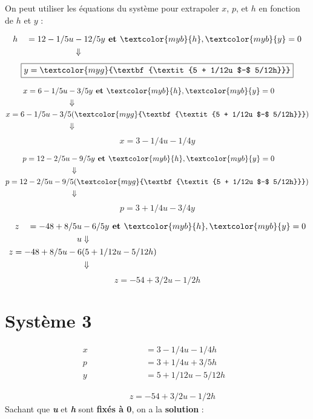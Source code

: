 \documentclass{report}
\newcommand{\Pointilles}[1]{%
  \par\nobreak
  \noindent\rule{0pt}{1.5\baselineskip}%
  \multido{}{#1}{\noindent\makebox[\linewidth]{\dotfill}\endgraf}%
  \bigskip%
}
\begin{document}
\begin{multicols*}{3}
On peut utiliser les équations du système pour extrapoler 
$x$, $p$, et $h$ en fonction de $h$ et $y$ :


\begin{align*}
    h \quad = 12 - 1/5u &-12/5y
    \textbf{ et } \textcolor{myb}{h}, \textcolor{myb}{y} = 0 
    \\
                 &\Downarrow
\end{align*}
      \[%
    \boxed{y = \textcolor{myg}{\textbf{\textit{5 + 1/12u $-$ 5/12h}}} }
      \]%


\begin{align*}
    x = 6 - 1/5u &-3/5y 
    \textbf{ et } \textcolor{myb}{h}, \textcolor{myb}{y} = 0 
    \\
      &\Downarrow
    \\ 
    x = 6 - 1/5u -3/&5(\textcolor{myg}{\textbf{\textit{5 + 1/12u $-$ 5/12h}}}) 
    \\
                    &\Downarrow
\end{align*}
      \[%
          \boxed{x = 3 -1/4u -1/4y}
      \]%

\begin{align*}
    p = 12 - 2/5u &-9/5y 
    \textbf{ et } \textcolor{myb}{h}, \textcolor{myb}{y} = 0 
    \\
      &\Downarrow
    \\ 
    p = 12 - 2/5u -9/&5(\textcolor{myg}{\textbf{\textit{5 + 1/12u $-$ 5/12h}}}) 
    \\
                    &\Downarrow
\end{align*}
      \[%
          \boxed{p = 3 + 1/4u -3/4y}
      \]%


\begin{align*}
    z \quad = -48 +8/5u &- 6/5y
    \textbf{ et } \textcolor{myb}{h}, \textcolor{myb}{y} = 0 
    \\
                    u  &\Downarrow \\
    z = -48 +8/5u -6&(5 +1/12u -5/12h)
    \\
                    &\Downarrow
\end{align*}
      \[%
    \boxed{z = -54 +3/2u -1/2h}
      \]%

\section{Système 3}
\begin{align*}
    x \quad\quad\quad\quad\quad\quad &= 3 - 1/4u -1/4h& \\
    p \quad\quad\quad\quad  &= 3 +1/4u +3/5h& \\
    y \quad\quad &= 5 + 1/12u -5/12h&
\end{align*}
\vspace{-2.5em}    
\Pointilles{1}
\vspace{-2.5em}
\begin{align*}
    \quad\quad\quad\;\; z = -54 +3/2u -1/2h
\end{align*}
Sachant que 
\textcolor{myb}{\textbf{\textit{u}}} et 
\textcolor{myb}{\textbf{\textit{h}}}  sont \textbf{fixés à 0}, 
on a la \textbf{solution} : 


\end{multicols*}
\end{document}
